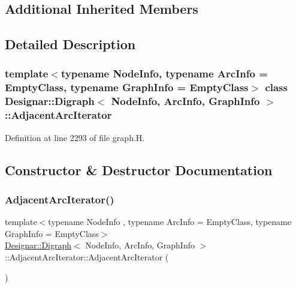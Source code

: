 \subsection*{Additional Inherited Members}


\subsection{Detailed Description}
\subsubsection*{template$<$typename Node\+Info, typename Arc\+Info = Empty\+Class, typename Graph\+Info = Empty\+Class$>$\newline
class Designar\+::\+Digraph$<$ Node\+Info, Arc\+Info, Graph\+Info $>$\+::\+Adjacent\+Arc\+Iterator}



Definition at line 2293 of file graph.\+H.



\subsection{Constructor \& Destructor Documentation}
\mbox{\label{class_designar_1_1_digraph_1_1_adjacent_arc_iterator_a44c04d22e04c7458517a41bced9338f6}} 
\subsubsection{\texorpdfstring{Adjacent\+Arc\+Iterator()}{AdjacentArcIterator()}\hspace{0.1cm}{\footnotesize\ttfamily [1/5]}}
{\footnotesize\ttfamily template$<$typename Node\+Info , typename Arc\+Info  = Empty\+Class, typename Graph\+Info  = Empty\+Class$>$ \\
\hyperlink{class_designar_1_1_digraph}{Designar\+::\+Digraph}$<$ Node\+Info, Arc\+Info, Graph\+Info $>$\+::Adjacent\+Arc\+Iterator\+::\+Adjacent\+Arc\+Iterator (\begin{DoxyParamCaption}{ }\end{DoxyParamCaption})\hspace{0.3cm}{\ttfamily [inline]}}



